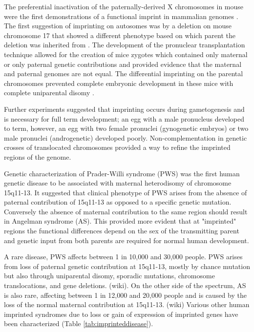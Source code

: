 The preferential inactivation of the paternally-derived X chromosomes in mouse were the first demonstrations of a functional imprint in mammalian genomes \cite{Takagi:1975ua,Lyon:1984gh,Chandra:1975tb}. The first suggestion of imprinting on autosomes was by a deletion on mouse chromosome 17 that showed a different phenotype based on which parent the deletion was inherited from \cite{Johnson:1974uf,Johnson:1974kc}. The development of the pronuclear transplantation technique allowed for the creation of mice zygotes which contained only maternal or only paternal genetic contributions and provided evidence that the maternal and paternal genomes are not equal. The differential imprinting on the parental chromosomes prevented complete embryonic development in these mice with complete uniparental disomy \cite{Sapienza:1989vm,McGrath:1984ky}. 

Further experiments suggested that imprinting occurs during gametogenesis and is necessary for full term development; an egg with a male pronucleus developed to term, however, an egg with two female pronuclei (gynogenetic embryos) or two male pronuclei (androgenetic) developed poorly\cite{Surani1984,McGrath:1984ky}. Non-complementation in genetic crosses of translocated chromosomes provided a way to refine the imprinted regions of the genome\cite{Cattanach:1985hu}. 

Genetic characterization of Prader-Willi syndrome (PWS) was the first human genetic disease to be associated with maternal heterodisomy of chromosome 15q11-13\cite{Nicholls:vh}. It suggested that  clinical phenotype of PWS arises from the absence of paternal contribution of 15q11-13 as opposed to a specific genetic mutation. Conversely the absence of maternal contribution to the same region should result in Angelman syndrome (AS)\cite{Nicholls:vh,Reik:1989el}. This provided more evident that at "imprinted" regions the functional differences depend on the sex of the transmitting parent and genetic input from both parents are required for normal human development\cite{Nicholls:vh}.

A rare disease, PWS affects between 1 in 10,000 and 30,000 people. PWS arises from loss of paternal genetic contribution at 15q11-13, mostly by chance mutation but also through uniparental disomy, sporadic mutations, chromosome translocations, and gene deletions. (wiki). On the other side of the spectrum, AS is also rare, affecting between 1 in 12,000 and 20,000 people and is caused by the loss of the normal maternal contribution at 15q11-13. (wiki) Various other human imprinted syndromes due to loss or gain of expression of imprinted genes have been characterized (Table \ref{tab:imprinteddisease}). \cite{Peters2014}

